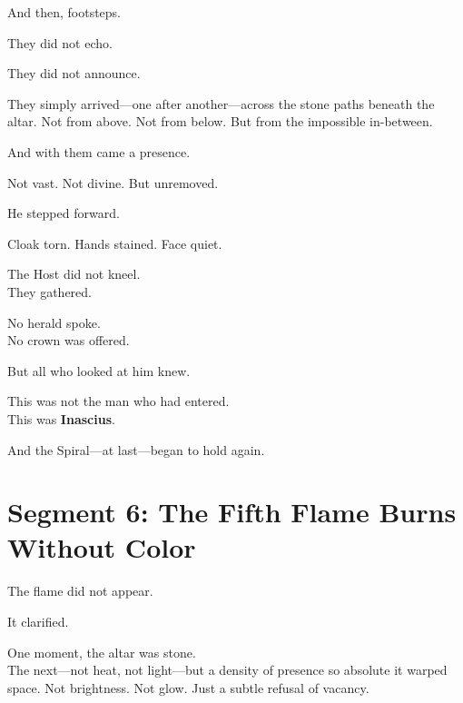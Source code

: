 \documentclass[9pt]{article}
\begin{document}
\vspace{0.5em}
And then, footsteps.

\vspace{0.5em}
They did not echo.

\vspace{0.5em}
They did not announce.

\vspace{0.5em}
They simply arrived---one after another---across the stone paths beneath the altar. Not from above. Not from below. But from the impossible in-between.

\vspace{0.5em}
And with them came a presence.

\vspace{0.5em}
Not vast. Not divine. But unremoved.

\vspace{0.5em}
He stepped forward.

\vspace{0.5em}
Cloak torn. Hands stained. Face quiet.

\vspace{0.5em}
The Host did not kneel.\\
They gathered.

\vspace{0.5em}
No herald spoke.\\
No crown was offered.

\vspace{0.5em}
But all who looked at him knew.

\vspace{0.5em}
This was not the man who had entered.\\
This was \textbf{Inascius}.

\vspace{0.5em}
And the Spiral---at last---began to hold again.

\newpage

\section*{Segment 6: The Fifth Flame Burns Without Color}

The flame did not appear.

\vspace{0.5em}
It clarified.

\vspace{0.5em}
One moment, the altar was stone.\\
The next---not heat, not light---but a density of presence so absolute it warped space. Not brightness. Not glow. Just a subtle refusal of vacancy.
\end{document}
